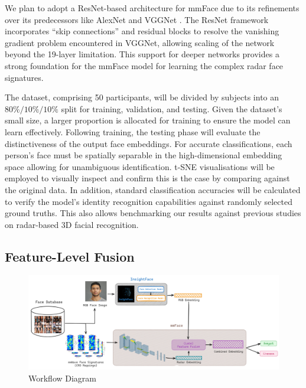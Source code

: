 \documentclass{mpaper}
\begin{document}
We plan to adopt a ResNet-based architecture for mmFace due to its refinements over its predecessors like AlexNet \cite{krizhevsky2012imagenet} and VGGNet \cite{simonyan2014very}. The ResNet framework \cite{he2016deep} incorporates ``skip connections'' and residual blocks to resolve the vanishing gradient problem encountered in VGGNet, allowing scaling of the network beyond the 19-layer limitation. This support for deeper networks provides a strong foundation for the mmFace model for learning the complex radar face signatures.

The dataset, comprising 50 participants, will be divided by subjects into an $80\%/10\%/10\%$ split for training, validation, and testing. Given the dataset's small size, a larger proportion is allocated for training to ensure the model can learn effectively. Following training, the testing phase will evaluate the distinctiveness of the output face embeddings. For accurate classifications, each person's face must be spatially separable in the high-dimensional embedding space allowing for unambiguous identification. t-SNE visualisations \cite{van2008visualizing} will be employed to visually inspect and confirm this is the case by comparing against the original data. In addition, standard classification accuracies will be calculated to verify the model's identity recognition capabilities against randomly selected ground truths. This also allows benchmarking our results against previous studies on radar-based 3D facial recognition.


\subsection{Feature-Level Fusion}


\begin{figure}[h!]
    \centering
    \includegraphics[width=1\textwidth]{diagrams/model_workflow.png}
    \caption{Workflow Diagram}
    \label{fig:model_workflow}
\end{figure}
\end{document}
